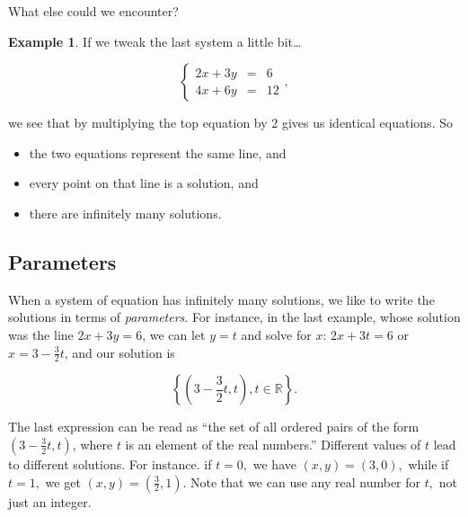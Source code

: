 \documentclass[
]{book}
\providecommand{\tightlist}{%
  \setlength{\itemsep}{0pt}\setlength{\parskip}{0pt}}
\theoremstyle{definition}
\theoremstyle{definition}
\newtheorem{example}{Example}[chapter]
\theoremstyle{definition}
\theoremstyle{definition}
\theoremstyle{remark}
\begin{document}
What else could we encounter?

\begin{examplebox}

\begin{example}

If we tweak the last system a little bit\ldots{}

\begin{equation*}
\left\{
\begin{array}{ccl}
2x+3y&=&6\\
    4x+6y&=&12
\end{array}\right. ,
\end{equation*}

we see that by multiplying the top equation by 2 gives us identical equations. So

\begin{itemize}
\tightlist
\item
  the two equations represent the same line, and
\item
  every point on that line is a solution, and
\item
  there are infinitely many solutions.
\end{itemize}

\end{example}

\end{examplebox}

\subsection*{Parameters}\label{parameters}

When a system of equation has infinitely many solutions, we like to write the solutions in terms of \emph{parameters}. For instance, in the last example, whose solution was the line \(2x+3y=6\), we can let \(y=t\) and solve for \(x\): \(2x+3t=6\) or \(x=3-\frac{3}{2}t\), and our solution is

\[\left\{(3-\frac{3}{2}t,t),t\in \mathbb{R}\right\}.\]

The last expression can be read as ``the set of all ordered pairs of the form \((3-\frac{3}{2}t,t)\), where \(t\) is an element of the real numbers.'' Different values of \(t\) lead to different solutions. For instance. if \(t=0,\) we have \((x,y)=(3,0),\) while if \(t=1,\) we get \((x,y)=\left(\frac{3}{2},1\right).\) Note that we can use any real number for \(t,\) not just an integer.
\end{document}
